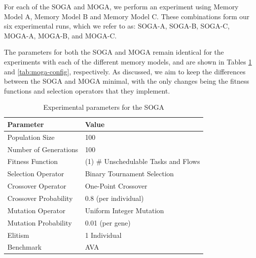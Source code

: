 \documentclass[10pt,conference]{IEEEtran}
\begin{document}
For each of the SOGA and MOGA, we perform an experiment using Memory Model A, Memory Model B and Memory Model C. These combinations form our six experimental runs, which we refer to as: SOGA-A, SOGA-B, SOGA-C, MOGA-A, MOGA-B, and MOGA-C.

The parameters for both the SOGA and MOGA remain identical for the experiments with each of the different memory models, and are shown in Tables \ref{tab:soga-config} and \ref{tab:moga-config}, respectively. As discussed, we aim to keep the differences between the SOGA and MOGA minimal, with the only changes being the fitness functions and selection operators that they implement.

\vspace{-1ex}
\begin{table}[!ht]
  \label{tab:soga-config}
  \centering
  \caption{Experimental parameters for the SOGA}
  \footnotesize
  \begin{tabularx}{0.48\textwidth}{lX}
    \toprule
    Parameter & Value \\
    \midrule
    Population Size & 100 \\
    Number of Generations & 100 \\
    Fitness Function & (1) \# Unschedulable Tasks and Flows \\
    Selection Operator & Binary Tournament Selection \\
    Crossover Operator & One-Point Crossover \\
    Crossover Probability & 0.8 (per individual) \\
    Mutation Operator & Uniform Integer Mutation \\
    Mutation Probability & 0.01 (per gene) \\
    Elitism & 1 Individual \\
    Benchmark & AVA \\
    \bottomrule
  \end{tabularx}
\end{table}
\vspace{-2ex}
\end{document}
